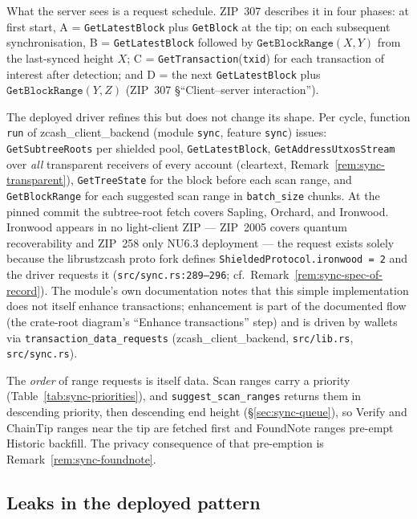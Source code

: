 \documentclass[11pt,a4paper]{article}
\theoremstyle{definition}
\begin{document}
What the server sees is a request schedule. ZIP~307 describes it in four
phases: at first start, \textsf{A} = \texttt{GetLatestBlock} plus
\texttt{GetBlock} at the tip; on each subsequent synchronisation,
\textsf{B} = \texttt{GetLatestBlock} followed by
$\texttt{GetBlockRange}(X, Y)$ from the last-synced height $X$;
\textsf{C} = \texttt{GetTransaction}(\texttt{txid}) for each transaction of
interest after detection; and \textsf{D} = the next
\texttt{GetLatestBlock} plus $\texttt{GetBlockRange}(Y, Z)$
(ZIP~307 \S``Client--server interaction'').

The deployed driver refines this but does not change its shape. Per cycle,
function \texttt{run} of \textsf{zcash\_client\_backend} (module
\texttt{sync}, feature \texttt{sync}) issues: \texttt{GetSubtreeRoots} per
shielded pool, \texttt{GetLatestBlock}, \texttt{GetAddressUtxosStream} over
\emph{all} transparent receivers of every account (cleartext,
Remark~\ref{rem:sync-transparent}), \texttt{GetTreeState} for the block
before each scan range, and \texttt{GetBlockRange} for each suggested scan
range in \texttt{batch\_size} chunks. At the pinned commit the subtree-root
fetch covers
Sapling, Orchard, and Ironwood. Ironwood appears in no light-client ZIP
--- ZIP~2005 covers quantum recoverability and ZIP~258 only NU6.3
deployment --- the request exists solely because the
\textsf{librustzcash} proto fork defines
\texttt{ShieldedProtocol.ironwood = 2} and the driver requests it
(\texttt{src/sync.rs:289--296}; cf.\
Remark~\ref{rem:sync-spec-of-record}).
The module's own documentation notes that this simple implementation does
not itself enhance transactions; enhancement is part of the documented
flow (the crate-root diagram's ``Enhance transactions'' step) and is driven
by wallets via \texttt{transaction\_data\_requests}
(\textsf{zcash\_client\_backend}, \texttt{src/lib.rs}, \texttt{src/sync.rs}).

The \emph{order} of range requests is itself data. Scan ranges carry a
priority (Table~\ref{tab:sync-priorities}), and
\texttt{suggest\_scan\_ranges} returns them in descending priority, then
descending end height (\S\ref{sec:sync-queue}), so \textsf{Verify} and
\textsf{ChainTip} ranges near the tip are fetched first and
\textsf{FoundNote} ranges pre-empt \textsf{Historic} backfill. The
privacy consequence of that pre-emption is
Remark~\ref{rem:sync-foundnote}.

\subsection{Leaks in the deployed pattern}\label{sec:sync-privacy-leaks}
\end{document}
